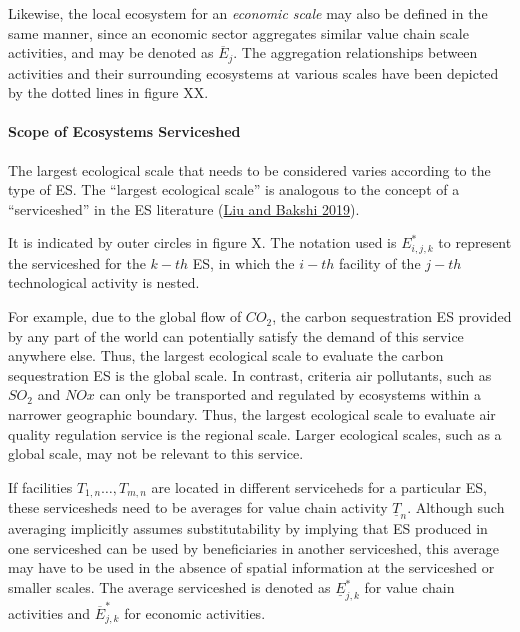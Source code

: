 \documentclass[
  14pt,
]{extarticle}
\begin{document}
Likewise, the local ecosystem for an \emph{economic scale} may also be defined in the same manner, since an economic sector aggregates similar value chain scale activities, and may be denoted as \(\overline{E}_{j}\).
The aggregation relationships between activities and their surrounding ecosystems at various scales have been depicted by the dotted lines in figure XX.

\hypertarget{scope-of-ecosystems-serviceshed}{%
\paragraph{Scope of Ecosystems Serviceshed}\label{scope-of-ecosystems-serviceshed}}

The largest ecological scale that needs to be considered varies according to the type of ES.
The ``largest ecological scale'' is analogous to the concept of a ``serviceshed'' in the ES literature (\protect\hyperlink{ref-Liu2019g}{Liu and Bakshi 2019}).

It is indicated by outer circles in figure X.
The notation used is \(E^{*}_{i,j,k}\) to represent the serviceshed for the \(k-th\) ES, in which the \(i-th\) facility of the \(j-th\) technological activity is nested.

For example, due to the global flow of \(CO_{2}\), the carbon sequestration ES provided by any part of the world can potentially satisfy the demand of this service anywhere else.
Thus, the largest ecological scale to evaluate the carbon sequestration ES is the global scale.
In contrast, criteria air pollutants, such as \(SO_{2}\) and \(NO{x}\) can only be transported and regulated by ecosystems within a narrower geographic boundary.
Thus, the largest ecological scale to evaluate air quality regulation service is the regional scale.
Larger ecological scales, such as a global scale, may not be relevant to this service.

If facilities \(T_{1,n}\dots,T_{m,n}\) are located in different serviceheds for a particular ES, these servicesheds need to be averages for value chain activity \(\underline{T}_{n}\).
Although such averaging implicitly assumes substitutability by implying that ES produced in one serviceshed can be used by beneficiaries in another serviceshed, this average may have to be used in the absence of spatial information at the serviceshed or smaller scales.
The average serviceshed is denoted as \(\underline{E}^{*}_{j,k}\) for value chain activities and \(\overline{E}^{*}_{j,k}\) for economic activities.
\end{document}

